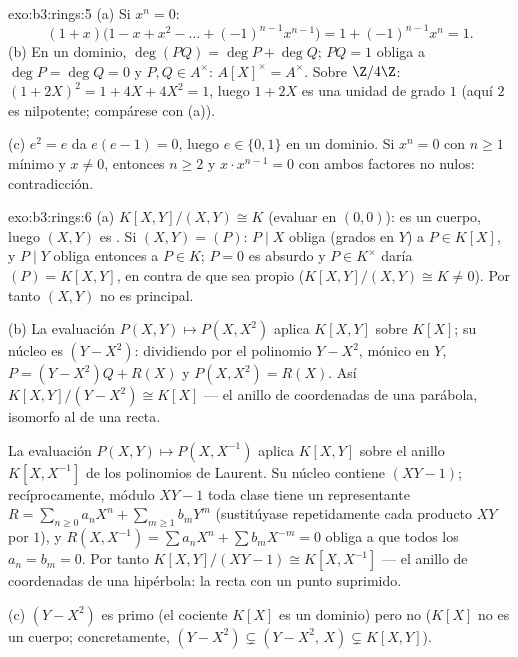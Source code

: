 \begin{solution}{exo:b3:rings:5}
(a) Si $x^n = 0$:
\[
(1 + x)\bigl(1 - x + x^2 - \dots + (-1)^{n-1}x^{n-1}\bigr)
= 1 + (-1)^{n-1}x^n = 1 .
\]
(b) En un dominio, $\deg(PQ) = \deg P + \deg Q$; $PQ = 1$ obliga a
$\deg P = \deg Q = 0$ y $P, Q \in A^\times$: $A[X]^\times =
A^\times$. Sobre $\Z/4\Z$: $(1 + 2X)^2 = 1 + 4X + 4X^2 = 1$, luego $1
+ 2X$ es una unidad de grado $1$ (aquí $2$ es nilpotente; compárese con
(a)).

(c) $e^2 = e$ da $e(e - 1) = 0$, luego $e \in \{0, 1\}$ en un dominio.
Si $x^n = 0$ con $n \geq 1$ mínimo y $x \ne 0$, entonces $n \geq 2$ y
$x \cdot x^{n-1} = 0$ con ambos factores no nulos: contradicción.
\end{solution}

\begin{solution}{exo:b3:rings:6}
(a) $K[X,Y]/(X,Y) \cong K$ (evaluar en $(0,0)$): es un cuerpo, luego
$(X,Y)$ es . Si
$(X, Y) = (P)$: $P \mid X$ obliga (grados en $Y$) a $P \in K[X]$, y
$P \mid Y$ obliga entonces a $P \in K$; $P =
0$ es absurdo y $P \in K^\times$ daría $(P) = K[X,Y]$, en contra de que
sea propio ($K[X,Y]/(X,Y) \cong K \neq 0$). Por tanto $(X,Y)$ no es
principal.

(b) La evaluación $P(X, Y) \mapsto P(X, X^2)$ aplica $K[X,Y]$ sobre
$K[X]$; su núcleo es $(Y - X^2)$: dividiendo por el polinomio $Y - X^2$,
mónico en $Y$, $P = (Y - X^2)Q + R(X)$ y $P(X, X^2) =
R(X)$. Así $K[X,Y]/(Y - X^2) \cong K[X]$ --- el anillo de coordenadas de
una parábola, isomorfo al de una recta.

La evaluación $P(X, Y) \mapsto P(X, X^{-1})$ aplica $K[X, Y]$ sobre el
anillo $K[X, X^{-1}]$ de los polinomios de Laurent. Su núcleo contiene
$(XY - 1)$; recíprocamente, módulo $XY - 1$ toda clase tiene un
representante $R = \sum_{n \geq 0} a_nX^n + \sum_{m \geq 1} b_m
Y^m$ (sustitúyase repetidamente cada producto $XY$ por $1$), y $R(X,
X^{-1}) = \sum a_n X^n + \sum b_m X^{-m} = 0$ obliga a que todos los
$a_n =
b_m = 0$. Por tanto $K[X, Y]/(XY - 1) \cong K[X, X^{-1}]$ --- el anillo
de coordenadas de una hipérbola: la recta con un punto suprimido.

(c) $(Y - X^2)$ es primo (el cociente $K[X]$ es un dominio) pero no
 ($K[X]$ no es un cuerpo;
concretamente, $(Y - X^2) \subsetneq
(Y - X^2,\, X) \subsetneq K[X,Y]$).
\end{solution}

